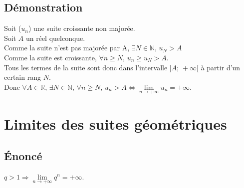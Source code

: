 \documentclass[12px]{article}
\begin{document}
	\subsection{Démonstration}
	Soit ($u_n$) une suite croissante non majorée.\\
	Soit $A$ un réel quelconque.\\
	Comme la suite n'est pas majorée par A, $\exists N\in\mathbb{N}, \,u_{N}>A$\\
	Comme la suite est croissante, $\forall n\geq N, \,u_n\geq u_{N}>A$.\\
	Tous les termes de la suite sont donc dans l'intervalle $]A;\,+\infty[$ à partir d'un certain rang $N$.\\
	Donc $\forall A\in\mathbb{R}, \,\exists N\in\mathbb{N}, \,\forall n\geq N, \,u_n >A \Leftrightarrow \lim\limits_{n\rightarrow +\infty}u_n =+\infty$.
	
	\section{Limites des suites géométriques}
	
	\subsection{\'Enoncé}
	$q>1 \Rightarrow \lim\limits_{n\rightarrow +\infty}q^n = +\infty$.
	
\end{document}
